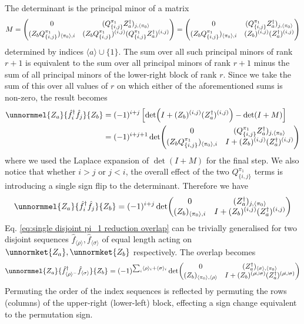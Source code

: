 \documentclass[12pt]{article}
\newcommand{\seq}[1]{\langle #1\rangle}
\newcommand{\hc}{^\dagger}
\begin{document}
	The determinant is the principal minor of a matrix
	\begin{equation}
	M = \mqty(0 & (Q^{\pi_1}_{\{i,j\}}Z_a\hc)_{j, \seq{\pi_0}}\\
		(Z_bQ^{\pi_1}_{\{i,j\}})_{\seq{\pi_0},i} & (Z_bQ^{\pi_1}_{\{i,j\}})^{(i,j)} (Q^{\pi_1}_{\{i,j\}}Z_a\hc)^{(i, j)}) = \mqty(0 & (Q^{\pi_1}_{\{i,j\}}Z_a\hc)_{j, \seq{\pi_0}}\\
		(Z_bQ^{\pi_1}_{\{i,j\}})_{\seq{\pi_0},i} & (Z_b)^{(i,j)} (Z_a\hc)^{(i, j)})
	\end{equation}
	determined by indices $\seq{a}\cup\{1\}$. The sum over all such principal minors of rank $r+1$ is equivalent to the sum over all principal minors of rank $r+1$ minus the sum of all principal minors of the lower-right block of rank $r$. Since we take the sum of this over all values of $r$ on which either of the aforementioned sums is non-zero, the result becomes
	\begin{align}
	\unnormmel{Z_a}{\hat{f}\hc_i\hat{f}_j}{Z_b} &= (-1)^{i+j}\left[\det(I+(Z_b)^{(i,j)} (Z_a\hc)^{(i, j)})-\det(I+M)\right]\nonumber\\
	&= (-1)^{i+j+1}\det(\mqty{
		0 & (Q^{\pi_1}_{\{i,j\}}Z_a\hc)_{j, \seq{\pi_0}}\\
		(Z_bQ^{\pi_1}_{\{i,j\}})_{\seq{\pi_0},i} & I+(Z_b)^{(i,j)} (Z_a\hc)^{(i, j)}
	})
	\end{align}
	where we used the Laplace expansion of $\det(I+M)$ for the final step. We also notice that whether $i>j$ or $j<i$, the overall effect of the two $Q^{\pi_1}_{\{i,j\}}$ terms is introducing a single sign flip to the determinant. Therefore we have
	\begin{equation} \label{eq:single disjoint pi_1 reduction overlap}
	\unnormmel{Z_a}{\hat{f}\hc_i\hat{f}_j}{Z_b} = (-1)^{i+j}\det(\mqty{
		0 & (Z_a\hc)_{j, \seq{\pi_0}}\\
		(Z_b)_{\seq{\pi_0},i} & I+(Z_b)^{(i,j)} (Z_a\hc)^{(i, j)}
	})
	\end{equation}
	Eq. \ref{eq:single disjoint pi_1 reduction overlap} can be trivially generalised for two disjoint sequences $\hat{f}_{\seq{\rho}},\hat{f}_{\seq{\sigma}}$ of equal length acting on $\unnormket{Z_a},\unnormket{Z_b}$ respectively. The overlap becomes
	\begin{equation} \label{eq:disjoint pi_1 reduction overlap}
	\unnormmel{Z_a}{\hat{f}\hc_{\seq{\rho}^-}\hat{f}_{\seq{\sigma}}}{Z_b} = (-1)^{\sum_i\seq{\rho}_i + \seq{\sigma}_i}\det(\mqty{
		0 & (Z_a\hc)_{\seq{\sigma}, \seq{\pi_0}}\\
		(Z_b)_{\seq{\pi_0},\seq{\rho}} & I+(Z_b)^{(\rho\cup \sigma)} (Z_a\hc)^{(\rho\cup\sigma)}
	})
	\end{equation}
	Permuting the order of the index sequences is reflected by permuting the rows (columns) of the upper-right (lower-left) block, effecting a sign change equivalent to the permutation sign.
	
\end{document}
